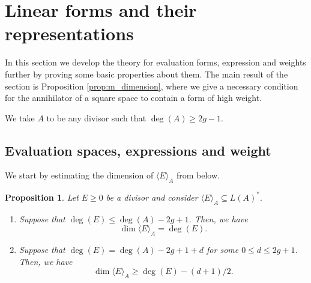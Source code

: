 \documentclass[12pt]{amsart}
\renewcommand{\leq}{\leqslant}
\renewcommand{\geq}{\geqslant}
\newtheorem{proposition}[theorem]{Proposition}
\theoremstyle{definition}
\newcommand{\divi}[1]{\langle #1 \rangle}
\begin{document}
	\section{Linear forms and their representations}\label{sec:lems}
	In this section we develop the theory for evaluation forms, expression and weights further by proving some basic properties about them. The main result of the section is Proposition \ref{prop:m_dimension}, where we give a necessary condition for the annihilator of a square space to contain a form of high weight.
	
	We take $A$ to be any divisor such that $\deg(A) \geq 2g - 1$. 
	\subsection{Evaluation spaces, expressions and weight}
	We start by estimating the dimension of $\divi E_A$ from below.
	\begin{proposition} \label{prop:linind}
		Let $E \geq 0$ be a divisor and consider $\langle E \rangle_A \subseteq L(A)^\ast.$
		\begin{enumerate}[\normalfont (i)]
			\item Suppose that $\deg (E) \leq \deg (A) - 2g + 1$. Then, we have
			$$\dim \langle E \rangle_A = \deg(E).$$ 
			\item Suppose that $\deg(E) = \deg(A) - 2g + 1 + d$ for some $0 \le d \le 2g + 1$. Then, we have
			$$\dim \langle E \rangle_A \geq \deg(E) - (d+1)/2.$$ 
		\end{enumerate}
	\end{proposition}
	
\end{document}

